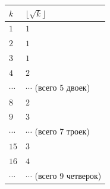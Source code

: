 \documentclass{book}
\begin{document}
\begin{tabularx}{0.6\textwidth} { 
  | >{\centering\arraybackslash}X 
  | >{\centering\arraybackslash}X | }
 \hline  $k$ & $\lfloor\sqrt{k}\rfloor$ \\
 \hline  $1$ & $1$ \\
 \hline  $2$ & $1$ \\
 \hline  $3$ & $1$ \\
 \hline  $4$ & $2$ \\
 \hline  $\cdots$ & $\cdots$ (всего 5 двоек) \\
 \hline  $8$ & $2$ \\
 \hline  $9$ & $3$ \\
 \hline  $\cdots$ & $\cdots$ (всего 7 троек) \\
 \hline  $15$ & $3$ \\
 \hline  $16$ & $4$ \\
 \hline  $\cdots$ & $\cdots$ (всего 9 четверок) \\
 \hline
\end{tabularx}
\end{document}
